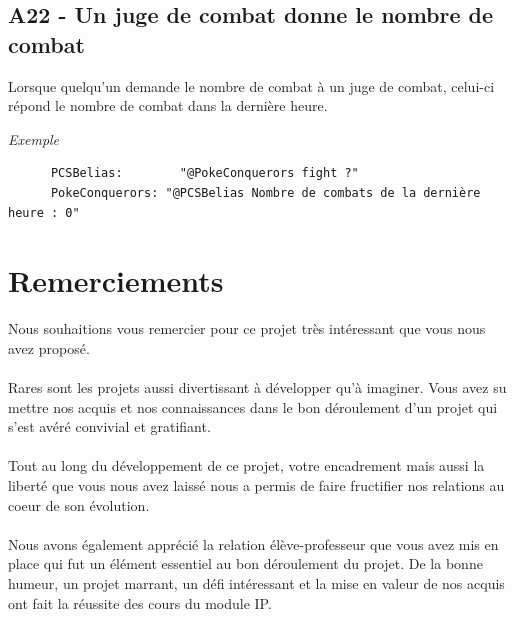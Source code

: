 \documentclass[12pt]{article}
\begin{document}
{{\subsection{A22 - Un juge de combat donne le nombre de combat}

Lorsque quelqu'un demande le nombre de combat à un juge de combat, celui-ci répond le nombre de combat dans la dernière heure.\\

{\noindent \textit{Exemple}
\begin{verbatim}
      PCSBelias: 	    "@PokeConquerors fight ?"
      PokeConquerors: "@PCSBelias Nombre de combats de la dernière heure : 0"
\end{verbatim}

\newpage
\section{Remerciements}

Nous souhaitions vous remercier pour ce projet très intéressant que vous nous avez proposé. \\
\\
Rares sont les projets aussi divertissant à développer qu'à imaginer. Vous avez su mettre nos acquis et nos connaissances dans le bon déroulement d'un projet qui s'est avéré convivial et gratifiant.\\
\\
Tout au long du développement de ce projet, votre encadrement mais aussi la liberté que vous nous avez laissé nous a permis de faire fructifier nos relations au coeur de son évolution.\\
\\
Nous avons également apprécié la relation élève-professeur que vous avez mis en place qui fut un élément essentiel au bon déroulement du projet. De la bonne humeur, un projet marrant, un défi intéressant et la mise en valeur de nos acquis ont fait la réussite des cours du module IP.

\newpage
}}}
\end{document}
